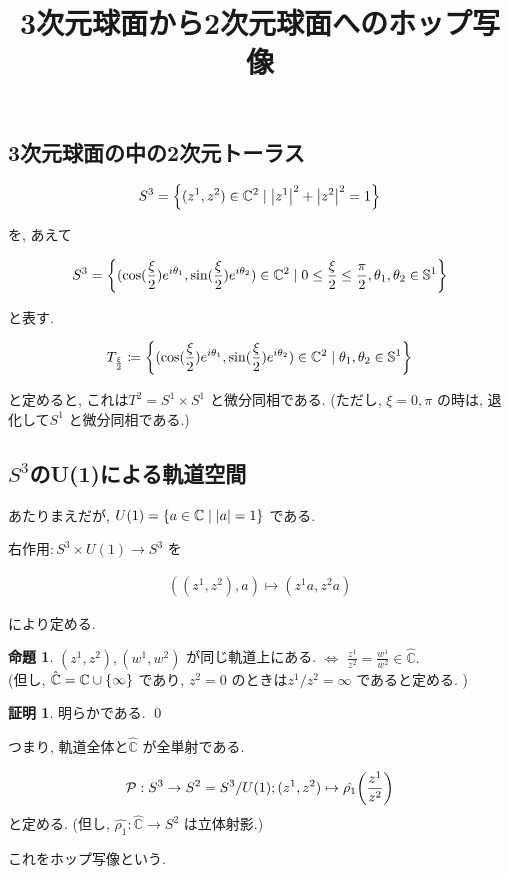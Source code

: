 \documentclass[10pt, fleqn, label-section=none]{bxjsarticle}
\title{3次元球面から2次元球面へのホップ写像}
\date{}
\author{}
\theoremstyle{definition}
\newtheorem{prop}[dfn]{命題}
\newtheorem*{pf*}{証明}
\newcommand{\paren}[1]{\mleft( #1\mright )}
\newcommand{\cbra}[1]{\mleft\{#1\mright\}}
\newcommand{\abs}[1]{\left|#1\right|}
\newcommand{\LR}{\Leftrightarrow}
\renewcommand{\;}{\, ; \,}
\begin{document}
\maketitle




\section{}

\subsection{3次元球面の中の2次元トーラス}


\begin{align*} S^3 = \cbra{(z^1, z^2) \in \mathbb C ^2 \mid \abs{z^1}^2  + \abs{z^2} ^2 = 1 }\end{align*}

を, あえて

\begin{align*} S^3 = \cbra{(\cos (\frac{\xi}{2}) e^{i \theta_1  } , \sin (\frac{\xi}{2}) e^{i \theta_2  } ) \in \mathbb C ^2 \mid 0 \leq \frac{\xi}{2} \leq \frac{\pi}{2}, \theta_1, \theta_2 \in \mathbb S^1 }  \end{align*}

と表す.

\begin{align*} T_{\frac{\xi}{2}} \coloneqq \cbra{(\cos (\frac{\xi}{2}) e^{i \theta_1  } , \sin (\frac{\xi}{2}) e^{i \theta_2  } ) \in \mathbb C ^2 \mid \theta_1, \theta_2 \in \mathbb S^1 } \end{align*}

と定めると, これは$T^2 = S^1 \times S^1$ と微分同相である. (ただし, $\xi = 0, \pi$ の時は, 退化して$S^1$ と微分同相である.)

\subsection{$S^3$のU(1)による軌道空間}

あたりまえだが, $U(1) = \cbra{a \in \mathbb C \mid \abs{a} = 1}$ である.

右作用$: S^3 \times U(1) \rightarrow S^3$ を

\begin{align*} ( (z^1, z^2) , a) \mapsto (z^1 a, z^2 a)\end{align*}

により定める.

\begin{prop}
$(z^1, z^2), (w^1, w^2)$ が同じ軌道上にある. $\LR$ $\frac{z^1}{z^2} = \frac{w^1}{w^2} \in \hat{\mathbb C}.$ \\
(但し, $\hat{\mathbb C} = \mathbb C \cup \cbra{\infty}$ であり, $z^2 = 0$ のときは$z^1/ z^2 = \infty$ であると定める. )
\end{prop}
\begin{pf*}
明らかである. 
\qed
\end{pf*}

つまり, 軌道全体と$\hat{\mathbb C}$ が全単射である.

\begin{align*} \mathcal P : S^3 \rightarrow S^2 = S^3 / U(1); (z^1, z^2) \mapsto \hat{\rho_1} \paren{\frac{z^1}{z^2}} \end{align*}
と定める. (但し, $\hat{\rho_1} : \hat{\mathbb C} \rightarrow S^2$ は立体射影.)

これをホップ写像という. 
\end{document}
